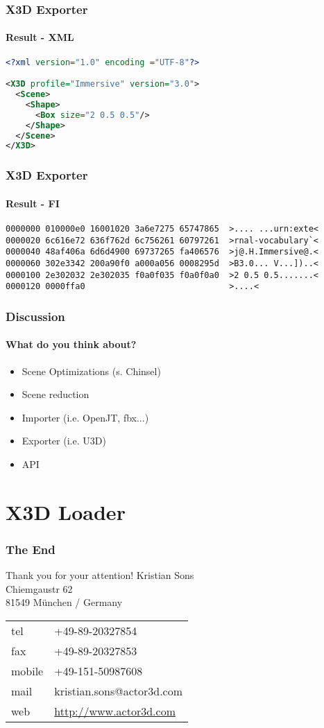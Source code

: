 \documentclass[t]{beamer}
\begin{document}
\begin{frame}[fragile]
\frametitle{X3D Exporter}
	\framesubtitle{Result - XML}
\begin{lstlisting}[language={xml}, title=Result XML encoded: 173 Byte]
<?xml version="1.0" encoding ="UTF-8"?>

<X3D profile="Immersive" version="3.0">
  <Scene>
    <Shape>
      <Box size="2 0.5 0.5"/>
    </Shape>
  </Scene>
</X3D>
\end{lstlisting}
\end{frame}

\begin{frame}[fragile]
\frametitle{X3D Exporter}
	\framesubtitle{Result - FI}
\begin{lstlisting}[title=Result Fast Infoset encoded: 82 Byte]
0000000 010000e0 16001020 3a6e7275 65747865  >.... ...urn:exte<
0000020 6c616e72 636f762d 6c756261 60797261  >rnal-vocabulary`<
0000040 48af406a 6d6d4900 69737265 fa406576  >j@.H.Immersive@.<
0000060 302e3342 200a90f0 a000a056 0008295d  >B3.0... V...])..<
0000100 2e302032 2e302035 f0a0f035 f0a0f0a0  >2 0.5 0.5.......<
0000120 0000ffa0                             >....<
\end{lstlisting}
\end{frame}


\begin{frame}
	\frametitle{Discussion}
	\framesubtitle{What do you think about?}
	\begin{itemize}
		\pause \item Scene Optimizations (s. Chinsel)
		\pause \item Scene reduction
		\pause \item Importer (i.e. OpenJT, fbx...)
		\pause \item Exporter (i.e. U3D)
		\pause \item API
	\end{itemize}
\end{frame}

\section{X3D Loader}

\begin{frame}
	\frametitle{The End}
	\begin{block}{Thank you for your attention!}
	Kristian Sons \\
	Chiemgaustr 62 \\
	81549 M\"{u}nchen / Germany \\ 
	\vspace{1cm}
	
	\begin{tabular}{ll}
	tel  &   +49-89-20327854\\
fax   &  +49-89-20327853\\
mobile & +49-151-50987608\\
mail  &  kristian.sons@actor3d.com\\
web   &  \hyperlink{http://www.actor3d.com}{http://www.actor3d.com}
\end{tabular}
	\end{block}
\end{frame}
\end{document}
